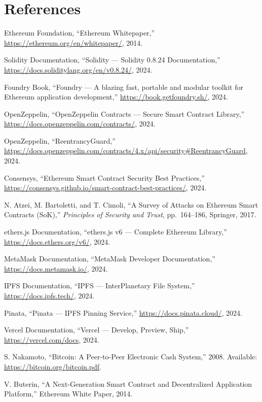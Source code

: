 \section*{References}

\begin{enumerate}[label={[\arabic*]}, leftmargin=2em]
    \item Ethereum Foundation, ``Ethereum Whitepaper,'' \url{https://ethereum.org/en/whitepaper/}, 2014.
    
    \item Solidity Documentation, ``Solidity --- Solidity 0.8.24 Documentation,'' \url{https://docs.soliditylang.org/en/v0.8.24/}, 2024.
    
    \item Foundry Book, ``Foundry --- A blazing fast, portable and modular toolkit for Ethereum application development,'' \url{https://book.getfoundry.sh/}, 2024.
    
    \item OpenZeppelin, ``OpenZeppelin Contracts --- Secure Smart Contract Library,'' \url{https://docs.openzeppelin.com/contracts/}, 2024.
    
    \item OpenZeppelin, ``ReentrancyGuard,'' \url{https://docs.openzeppelin.com/contracts/4.x/api/security#ReentrancyGuard}, 2024.
    
    \item Consensys, ``Ethereum Smart Contract Security Best Practices,'' \url{https://consensys.github.io/smart-contract-best-practices/}, 2024.
    
    \item N. Atzei, M. Bartoletti, and T. Cimoli, ``A Survey of Attacks on Ethereum Smart Contracts (SoK),'' \textit{Principles of Security and Trust}, pp.\ 164--186, Springer, 2017.
    
    \item ethers.js Documentation, ``ethers.js v6 --- Complete Ethereum Library,'' \url{https://docs.ethers.org/v6/}, 2024.
    
    \item MetaMask Documentation, ``MetaMask Developer Documentation,'' \url{https://docs.metamask.io/}, 2024.
    
    \item IPFS Documentation, ``IPFS --- InterPlanetary File System,'' \url{https://docs.ipfs.tech/}, 2024.
    
    \item Pinata, ``Pinata --- IPFS Pinning Service,'' \url{https://docs.pinata.cloud/}, 2024.
    
    \item Vercel Documentation, ``Vercel --- Develop, Preview, Ship,'' \url{https://vercel.com/docs}, 2024.
    
    \item S. Nakamoto, ``Bitcoin: A Peer-to-Peer Electronic Cash System,'' 2008. Available: \url{https://bitcoin.org/bitcoin.pdf}.
    
    \item V. Buterin, ``A Next-Generation Smart Contract and Decentralized Application Platform,'' Ethereum White Paper, 2014.
\end{enumerate}
